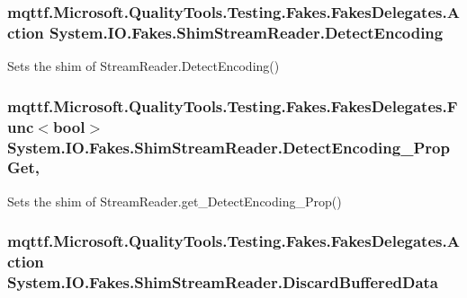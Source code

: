 \hypertarget{class_system_1_1_i_o_1_1_fakes_1_1_shim_stream_reader_a9ca01682013d697db472af9f0a5e5e41}{
\subsubsection[{Detect\-Encoding}]{\setlength{\rightskip}{0pt plus 5cm}mqttf.\-Microsoft.\-Quality\-Tools.\-Testing.\-Fakes.\-Fakes\-Delegates.\-Action System.\-I\-O.\-Fakes.\-Shim\-Stream\-Reader.\-Detect\-Encoding\hspace{0.3cm}{\ttfamily [set]}}}\label{class_system_1_1_i_o_1_1_fakes_1_1_shim_stream_reader_a9ca01682013d697db472af9f0a5e5e41}


Sets the shim of Stream\-Reader.\-Detect\-Encoding()

\hypertarget{class_system_1_1_i_o_1_1_fakes_1_1_shim_stream_reader_a45e07915ae31e6ef26acfe56c7b287cd}{
\subsubsection[{Detect\-Encoding\-\_\-\-Prop\-Get}]{\setlength{\rightskip}{0pt plus 5cm}mqttf.\-Microsoft.\-Quality\-Tools.\-Testing.\-Fakes.\-Fakes\-Delegates.\-Func$<$bool$>$ System.\-I\-O.\-Fakes.\-Shim\-Stream\-Reader.\-Detect\-Encoding\-\_\-\-Prop\-Get\hspace{0.3cm}{\ttfamily [get]}, {\ttfamily [set]}}}\label{class_system_1_1_i_o_1_1_fakes_1_1_shim_stream_reader_a45e07915ae31e6ef26acfe56c7b287cd}


Sets the shim of Stream\-Reader.\-get\-\_\-\-Detect\-Encoding\-\_\-\-Prop()

\hypertarget{class_system_1_1_i_o_1_1_fakes_1_1_shim_stream_reader_a8f4f8633dc8e0d4309170c5f8beb482a}{
\subsubsection[{Discard\-Buffered\-Data}]{\setlength{\rightskip}{0pt plus 5cm}mqttf.\-Microsoft.\-Quality\-Tools.\-Testing.\-Fakes.\-Fakes\-Delegates.\-Action System.\-I\-O.\-Fakes.\-Shim\-Stream\-Reader.\-Discard\-Buffered\-Data\hspace{0.3cm}{\ttfamily [set]}}}\label{class_system_1_1_i_o_1_1_fakes_1_1_shim_stream_reader_a8f4f8633dc8e0d4309170c5f8beb482a}


